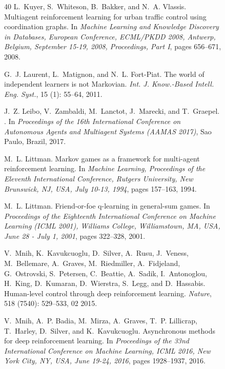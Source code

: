 \documentclass{article}
\begin{document}
\begin{figure}
\begin{thebibliography}{40}
L.~Kuyer, S.~Whiteson, B.~Bakker, and N.~A. Vlassis.
\newblock Multiagent reinforcement learning for urban traffic control using
  coordination graphs.
\newblock In \emph{Machine Learning and Knowledge Discovery in Databases,
  European Conference, {ECML/PKDD} 2008, Antwerp, Belgium, September 15-19,
  2008, Proceedings, Part {I}}, pages 656--671, 2008.

G.~J. Laurent, L.~Matignon, and N.~L. Fort-Piat.
\newblock The world of independent learners is not {M}arkovian.
\newblock \emph{Int. J. Know.-Based Intell. Eng. Syst.}, 15
  (1): 55--64, 2011.

J.~Z. Leibo, V.~Zambaldi, M.~Lanctot, J.~Marecki, and T.~Graepel.
.
\newblock In \emph{Proceedings of the 16th International Conference on
  Autonomous Agents and Multiagent Systems (AAMAS 2017)}, Sao Paulo, Brazil,
  2017.

M.~L. Littman.
\newblock Markov games as a framework for multi-agent reinforcement learning.
\newblock In \emph{Machine Learning, Proceedings of the Eleventh International
  Conference, Rutgers University, New Brunswick, NJ, USA, July 10-13, 1994},
  pages 157--163, 1994.

M.~L. Littman.
\newblock Friend-or-foe q-learning in general-sum games.
\newblock In \emph{Proceedings of the Eighteenth International Conference on
  Machine Learning {(ICML} 2001), Williams College, Williamstown, MA, USA, June
  28 - July 1, 2001}, pages 322--328, 2001.

V.~Mnih, K.~Kavukcuoglu, D.~Silver, A.~Rusu, J.~Veness, M.~Bellemare,
  A.~Graves, M.~Riedmiller, A.~Fidjeland, G.~Ostrovski, S.~Petersen,
  C.~Beattie, A.~Sadik, I.~Antonoglou, H.~King, D.~Kumaran, D.~Wierstra,
  S.~Legg, and D.~Hassabis.
\newblock Human-level control through deep reinforcement learning.
\newblock \emph{Nature}, 518 (7540): 529--533, 02 2015.

V.~Mnih, A.~P. Badia, M.~Mirza, A.~Graves, T.~P. Lillicrap, T.~Harley,
  D.~Silver, and K.~Kavukcuoglu.
\newblock Asynchronous methods for deep reinforcement learning.
\newblock In \emph{Proceedings of the 33nd International Conference on Machine
  Learning, {ICML} 2016, New York City, NY, USA, June 19-24, 2016}, pages
  1928--1937, 2016.


\end{thebibliography}
\end{figure}
\end{document}
